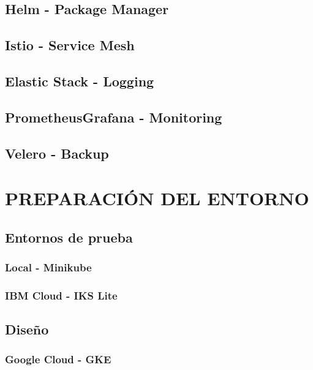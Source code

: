 \documentclass[spanish,twoside,12pt,a4paper]{book}
\begin{document}
\section{Helm - Package Manager}


\section{Istio - Service Mesh}

\section{Elastic Stack - Logging}

\section{PrometheusGrafana - Monitoring}

\section{Velero - Backup}

\chapter{PREPARACIÓN DEL ENTORNO}

\section{Entornos de prueba}

\subsection{Local - Minikube}

\subsection{IBM Cloud - IKS Lite}

\section{Diseño}

\subsection{Google Cloud - GKE}
\end{document}
